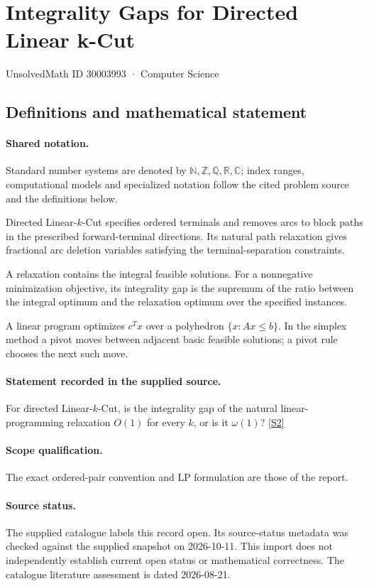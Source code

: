 \documentclass[11pt]{article}
\newcommand{\sref}[2]{\hyperlink{source:#1:#2}{[S#2]}}
\begin{document}
\setcounter{section}{30003992}
\section{Integrality Gaps for Directed Linear k-Cut}\label{30003993}
{\small\sffamily UnsolvedMath ID 30003993 · Computer Science}
\subsection{Definitions and mathematical statement}

\paragraph{Shared notation.}Standard number systems are denoted by $\mathbb N,\mathbb Z,\mathbb Q,\mathbb R,\mathbb C$; index ranges, computational models and specialized notation follow the cited problem source and the definitions below.


Directed Linear-$k$-Cut specifies ordered terminals and removes arcs to block paths in the prescribed forward-terminal directions. Its natural path relaxation gives fractional arc deletion variables satisfying the terminal-separation constraints.

A relaxation contains the integral feasible solutions. For a nonnegative minimization objective, its integrality gap is the supremum of the ratio between the integral optimum and the relaxation optimum over the specified instances.

A linear program optimizes $c^Tx$ over a polyhedron $\{x:Ax\leq b\}$. In the simplex method a pivot moves between adjacent basic feasible solutions; a pivot rule chooses the next such move.
\paragraph{Statement recorded in the supplied source.}
For directed Linear-$k$-Cut, is the integrality gap of the natural linear-programming relaxation $O(1)$ for every $k$, or is it $\omega(1)$? \sref{30003993}{2}
\paragraph{Scope qualification.}
The exact ordered-pair convention and LP formulation are those of the report.
\paragraph{Source status.}
The supplied catalogue labels this record open. Its source-status metadata was checked against the supplied snapshot on 2026-10-11. This import does not independently establish current open status or mathematical correctness. The catalogue literature assessment is dated 2026-08-21.
\end{document}
